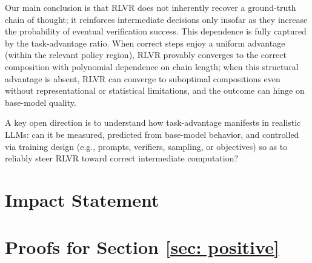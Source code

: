 \documentclass{article}
\theoremstyle{plain}
\theoremstyle{definition}
\theoremstyle{remark}
\begin{document}
Our main conclusion is that RLVR does not inherently recover a ground-truth chain of thought; it reinforces intermediate decisions only insofar as they increase the probability of eventual verification success. This dependence is fully captured by the task-advantage ratio. When correct steps enjoy a uniform advantage (within the relevant policy region), RLVR provably converges to the correct composition with polynomial dependence on chain length; when this structural advantage is absent, RLVR can converge to suboptimal compositions even without representational or statistical limitations, and the outcome can hinge on base-model quality.

A key open direction is to understand how task-advantage manifests in realistic LLMs: can it be measured, predicted from base-model behavior, and controlled via training design (e.g., prompts, verifiers, sampling, or objectives) so as to reliably steer RLVR toward correct intermediate computation?

\section*{Impact Statement}




\newpage
\appendix
\onecolumn



\section{Proofs for Section \ref{sec: positive}} \label{app: positive}
\end{document}
